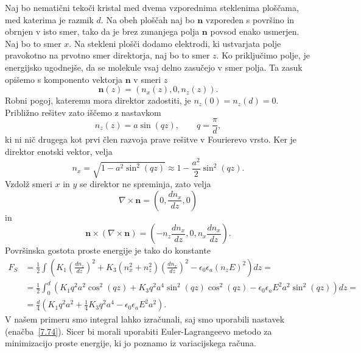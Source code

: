 Naj bo nematični tekoči kristal med dvema vzporednima
steklenima ploščama, med katerima je razmik $d$. Na obeh ploščah naj bo $\mathbf{n}$ vzporeden
s površino in obrnjen v isto smer, tako da je brez zunanjega 
polja $\mathbf{n}$ povsod enako usmerjen. Naj bo to smer $x$.
Na stekleni plošči dodamo elektrodi, ki ustvarjata polje pravokotno na 
prvotno smer direktorja, naj bo to smer $z$.
Ko priključimo polje, je energijsko ugodnejše, da
se molekule vsaj delno zasučejo v smer polja. Ta zasuk opišemo s
komponento vektorja $\mathbf{n}$ v smeri $z$
\begin{equation}
\mathbf{n}(z)=(n_{x}(z),0,n_{z}(z)).
\label{7.73}
\end{equation}
Robni pogoj, kateremu mora direktor zadostiti,
je $n_{z}(0)=n_{z}(d)=0$. Približno rešitev zato iščemo z nastavkom 
\begin{equation}
n_{z}(z)=a\sin (qz), \qquad q=\frac{\pi}{d},
\label{7.74}
\end{equation}
ki ni nič drugega kot prvi člen razvoja prave rešitve v Fourierevo vrsto.
Ker je direktor enotski vektor, velja
\begin{equation}
n_x = \sqrt{1-a^2\sin^2(qz)} \approx 1 - \frac{a^2}{2}\sin^2(qz).
\end{equation}
Vzdolž smeri $x$ in $y$ se direktor ne spreminja, zato velja
\begin{equation}
\nabla\times\mathbf{n}=(0,\frac{dn_{x}}{dz},0)
\label{7.75}
\end{equation}
 in 
\begin{equation}
\mathbf{n}\times(\nabla\times\mathbf{n})=(-n_{z}\frac{dn_{x}}{dz},0,
n_{x}\frac{dn_{x}}{dz}).
\label{7.76}
\end{equation}
Površinska gostota proste energije je tako do konstante
\begin{align}
F_S & =  \frac{1}{2}\int\left(K_{1}\left(\frac{dn_{z}}{dz}\right)^{2}+K_{3}(n_x^2+n_{z}^{2})
\left(\frac{dn_{x}}{dz}\right)^{2}-
\epsilon_{0}\epsilon_{a}(n_{z}E)^{2}\right)dz=\nonumber \\
 & =  \frac{1}{2}\int_{0}^{d}
 \left(K_{1}q^{2}a^{2}\cos^{2}(qz)+K_{3}q^{2}a^{4}\sin^{2}(qz)\cos^2(qz)-
 \epsilon_{0}\epsilon_{a}E^2a^{2}\sin^{2}(qz)\right)dz=\nonumber \\
 & =  \frac{d}{4}\left( K_{1}q^{2}a^2+\frac{1}{4}K_{3}q^{2}a^4-\epsilon_{0}\epsilon_{a}E^2a^2\right).
\end{align}
V našem primeru smo integral lahko izračunali, saj smo uporabili nastavek (enačba~\ref{7.74}).
Sicer bi morali uporabiti Euler-Lagrangeevo metodo za minimizacijo proste energije, ki 
jo poznamo iz variacijskega računa.

